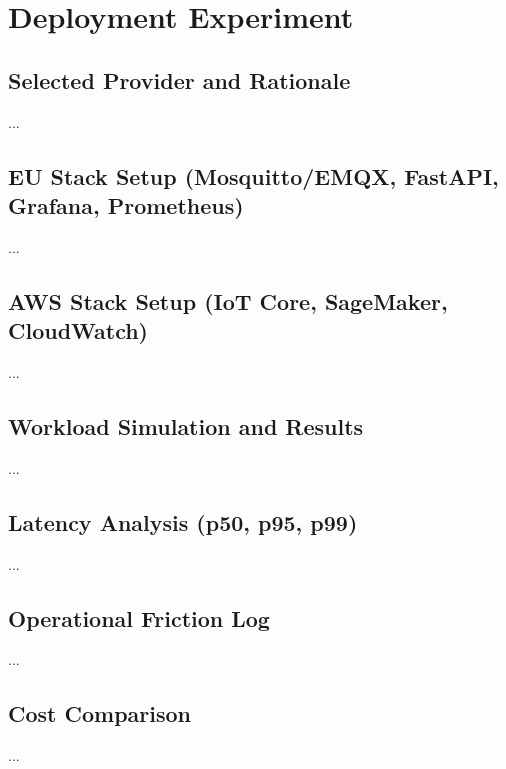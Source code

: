 \chapter{Deployment Experiment}

\section{Selected Provider and Rationale}
...
\section{EU Stack Setup (Mosquitto/EMQX, FastAPI, Grafana, Prometheus)}
...
\section{AWS Stack Setup (IoT Core, SageMaker, CloudWatch)}
...
\section{Workload Simulation and Results}
...
\section{Latency Analysis (p50, p95, p99)}
...
\section{Operational Friction Log}
...
\section{Cost Comparison}
...